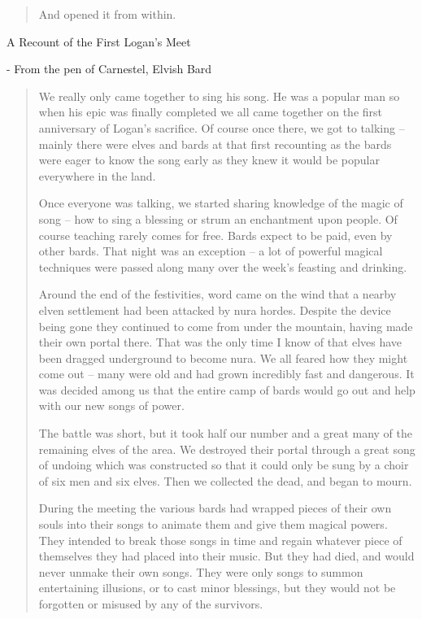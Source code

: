 \begin{multicols}{2}
\begin{verse}
And opened it from within.

\end{verse}

A Recount of the First Logan's Meet

	- From the pen of Carnestel, Elvish Bard


\begin{quotation}
We really only came together to sing his song.  He was a popular man so when his epic was finally completed we all came together on the first anniversary of Logan's sacrifice.  Of course once there, we got to talking -- mainly there were elves and bards at that first recounting as the bards were eager to know the song early as they knew it would be popular everywhere in the land.

	Once everyone was talking, we started sharing knowledge of the magic of song -- how to sing a blessing or strum an enchantment upon people.  Of course teaching rarely comes for free.  Bards expect to be paid, even by other bards.  That night was an exception -- a lot of powerful magical techniques were passed along many over the week's feasting and drinking.

	Around the end of the festivities, word came on the wind that a nearby elven settlement had been attacked by nura hordes.  Despite the device being gone they continued to come from under the mountain, having made their own portal there.  That was the only time I know of that elves have been dragged underground to become nura.  We all feared how they might come out -- many were old and had grown incredibly fast and dangerous.  It was decided among us that the entire camp of bards would go out and help with our new songs of power.

	The battle was short, but it took half our number and a great many of the remaining elves of the area.  We destroyed their portal through a great song of undoing which was constructed so that it could only be sung by a choir of six men and six elves.  Then we collected the dead, and began to mourn.

	During the meeting the various bards had wrapped pieces of their own souls into their songs to animate them and give them magical powers.  They intended to break those songs in time and regain whatever piece of themselves they had placed into their music.  But they had died, and would never unmake their own songs.  They were only songs to summon entertaining illusions, or to cast minor blessings, but they would not be forgotten or misused by any of the survivors.


\end{quotation}
\end{multicols}
